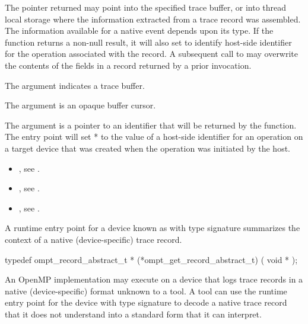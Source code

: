 \descr

The pointer returned  may point into the specified trace buffer, or into
thread local storage where the information extracted from a trace
record was assembled. The information available for a native event
depends upon its type. If the function returns a non-null result,
it will also set  to identify host-side identifier
for the operation associated with the record.  A subsequent call
to  may overwrite the
contents of the fields in a record returned by a prior invocation.

\argdesc
The argument  indicates a trace buffer.

The argument  is an opaque buffer cursor.

The argument  is a pointer to an identifier
that will be returned by the function. The entry point will set
* to the value of a host-side identifier for an operation on
a target device that was created when the operation was initiated by
the host.


\crossreferences
\begin{itemize}
\item {},
see .
\item {},
see .
\item {},
see .
\end{itemize}

\label{sec:ompt_get_record_abstract_t}

\summary
A runtime entry point for a device known as
with type signature
summarizes the context of a native (device-specific) trace record.

\format
\begin{ccppspecific}
\begin{omptOther}
typedef ompt_record_abstract_t *
(*ompt_get_record_abstract_t) (
  void *
);
\end{omptOther}
\end{ccppspecific}

\descr
An OpenMP implementation may execute on a device that logs
trace records in a native (device-specific) format unknown to a tool.
A tool can use the 
runtime entry point for the device with type signature
to decode a native trace record that it
does not understand into a standard form that it can interpret.

